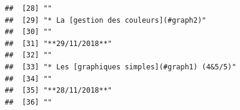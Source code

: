 \documentclass[]{book}
\begin{document}
\begin{verbatim}
##  [28] ""                                                                                                                                                                                                                                                                                                           
##  [29] "* La [gestion des couleurs](#graph2)"                                                                                                                                                                                                                                                                       
##  [30] ""                                                                                                                                                                                                                                                                                                           
##  [31] "**29/11/2018**"                                                                                                                                                                                                                                                                                             
##  [32] ""                                                                                                                                                                                                                                                                                                           
##  [33] "* Les [graphiques simples](#graph1) (4&5/5)"                                                                                                                                                                                                                                                                
##  [34] ""                                                                                                                                                                                                                                                                                                           
##  [35] "**28/11/2018**"                                                                                                                                                                                                                                                                                             
##  [36] ""                                                                                                                                                                                                                                                                                                           

\end{verbatim}
\end{document}
